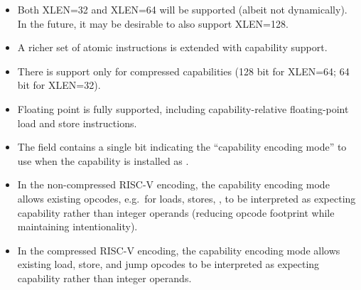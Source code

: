 \begin{itemize}
  In CHERI-RISC-V, the interpretation of addresses in memory capabilities
  depends on whether virtual addressing is enabled via the RISC-V
  \texttt{satp} CSR\footnote{This is not a substantially different design
  choice than in CHERI-MIPS or with MMU addressing enabled: memory
  capabilities are interpreted relative to the active address space, and
  control of that address space is delegated to suitably privileged code,
  whether configuring a simple direct map between virtual and physical memory,
  or managing multiple more complex address spaces.
  In all cases, care is required as physical-memory access authorized by a
  capability is determined by the addressing mode and current translation
  table contents.}.
  When \texttt{satp} is set to \texttt{Bare}, capabilities have a
  physical-address interpretation.
  When \texttt{satp} enables page-table translation, capabilities have a
  virtual-address interpretation.
\item Both XLEN=32 and XLEN=64 will be supported (albeit not dynamically).
  In the future, it may be desirable to also support XLEN=128.
\item A richer set of atomic instructions is extended with capability
  support.
\item There is support only for compressed capabilities (128 bit for XLEN=64;
  64 bit for XLEN=32).
\item Floating point is fully supported, including capability-relative
  floating-point load and store instructions.
\item The \cflags{} field contains a single bit indicating the ``capability
  encoding mode'' to use when the capability is installed as \PCC{}.
\item In the non-compressed RISC-V encoding, the capability encoding mode
  allows existing opcodes, e.g.\ for loads, stores, ,
  to be interpreted as expecting capability rather than integer operands
  (reducing opcode footprint while maintaining intentionality).
\item In the compressed RISC-V encoding, the capability encoding mode allows
  existing load, store, and jump opcodes to be interpreted as expecting
  capability rather than integer operands.

%
\end{itemize}


